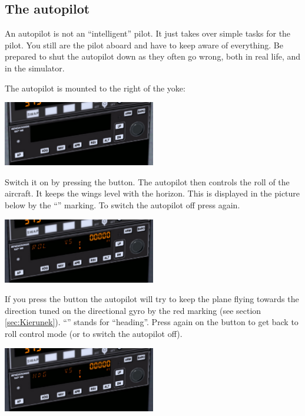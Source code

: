 \begin{itemize}
\section{The autopilot}
\label{sec:Autopilot}

An autopilot is not an ``intelligent'' pilot. It just takes over simple tasks
for the pilot. You still are the pilot aboard and have to keep aware of
everything. Be prepared to shut the autopilot down as they often go wrong,
both in real life, and in the simulator.

The autopilot is mounted to the right of the yoke:

\begin{center}
\includegraphics[width=0.5\textwidth]{img/tut_49}
\end{center}

Switch it on by pressing the  button.
The autopilot then controls the roll of the aircraft. It keeps the wings level with the horizon. This is
displayed in the picture below by the ``\textcolor{orange}{}''
marking. To switch the autopilot off press  again.

\begin{center}
\includegraphics[width=0.5\textwidth]{img/tut_50}
\end{center}

 If you press the  button the autopilot will try to keep
the plane flying towards the direction tuned on the directional gyro by
the red marking (see section \ref{sec:Kierunek}).
``\textcolor{orange}{}'' stands for ``heading''. Press
again on the  button to get back to roll control mode (or
 to switch the autopilot off).

\begin{center}
\includegraphics[width=0.5\textwidth]{img/tut_51}
\end{center}


\end{itemize}
